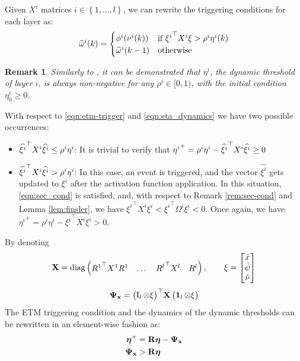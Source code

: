 \documentclass{ifacconf}
\theoremstyle{plain}
\newtheorem{remark}{Remark}
\begin{document}
Given $X^i$ matrices $i \in \left\{1, \dots, l \right\}$, we can rewrite the triggering conditions for each layer as:
\begin{equation}\label{eqn:etm-trigger}
  \widehat{\omega}^{i}(k) = \begin{cases}
    \phi^i(\nu^i(k)) & \text{if } {\xi^i}^\top X^i \xi > \rho^i \eta^i(k)\\
    \widehat{\omega}^{i}(k-1) & \text{otherwise}
  \end{cases}
\end{equation}
\begin{remark}\label{rem:eta-positive} \emph{Similarly to \citep[Lemma 3]{data-driven}, it can be demonstrated that $\eta^i$, the dynamic threshold of layer $i$, is always non-negative for any $\rho^i \in [0, 1)$, with the initial condition $\eta^i_0 \geq 0$.} \end{remark}
With respect to \eqref{eqn:etm-trigger} and \eqref{eqn:eta_dynamics} we have two possible occurrences:
\begin{itemize}
    \item $\widehat{{\xi^i}}^\top X^i \widehat{\xi^i} \leq \rho^i \eta^i$: It is trivial to verify that ${\eta^i}^+ = \rho^i \eta^i - \widehat{{\xi^i}}^\top X^i \widehat{\xi^i} \geq 0 $
    \item $\widehat{\xi^i}^\top X^i \widehat{\xi^i} > \rho^i \eta^i$: In this case, an event is triggered, and the vector $\widehat{\xi^i}$ gets updated to $\xi^i$ after the activation function application. In this situation, \eqref{eqn:sec_cond} is satisfied, and, with respect to Remark \ref{rem:sec-cond} and Lemma \ref{lem:finsler}, we have ${\xi^i}^\top X^i \xi^i < {\xi^i}^\top \Omega^i \xi^i < 0$. Once again, we have ${\eta^i}^+ = \rho^i \eta^i - {\xi^i}^\top X^i \xi^i > 0$.
\end{itemize}
By denoting 
\begin{equation}
    {\bf{X}} = \text{diag} \left(\begin{matrix}{R^1}^\top X^1 R^1 & \dots & {R^l}^\top X^l & R^l\end{matrix}\right), \qquad \xi = \left[\begin{matrix}\tilde{x} \\ \tilde{\psi} \\ \tilde{\nu}\end{matrix}\right]
\end{equation}
\begin{equation}\label{eqn:final-psi}
    \mathbf{\Psi_x} = \left(\begin{matrix}\operatorname{I}_l \otimes \xi\end{matrix}\right)^\top\! {\bf{X}} \left(\begin{matrix}\operatorname{\mathbf{1}}_l \otimes \xi\end{matrix}\right)
\end{equation}
The ETM triggering condition and the dynamics of the dynamic thresholds can be rewritten in an element-wise fashion as:
\begin{equation}
\begin{aligned}
    \boldsymbol{\eta}^+ &= {\bf{R}} \boldsymbol{\eta} - \mathbf{\Psi_x}\\
    \mathbf{\Psi_x} &> {\bf{R}} \boldsymbol{\eta}\end{aligned}
\end{equation}
\end{document}
